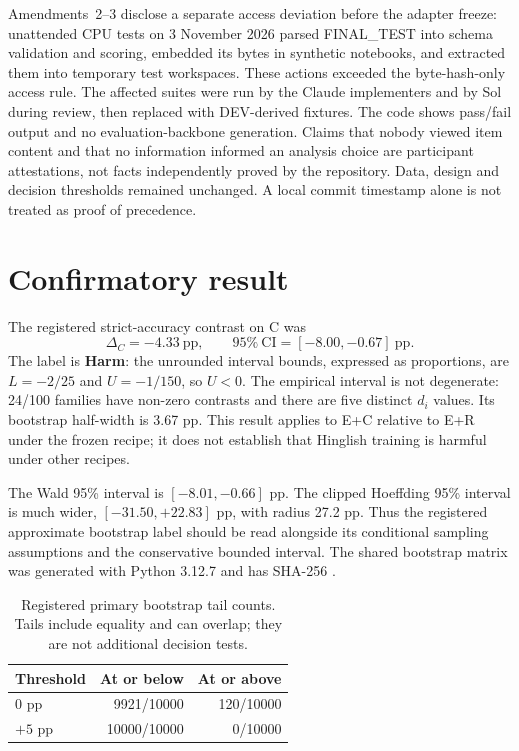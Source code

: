 Amendments~2--3 disclose a separate access deviation before the adapter freeze: unattended CPU tests on 3 November 2026 parsed FINAL\_TEST into schema validation and scoring, embedded its bytes in synthetic notebooks, and extracted them into temporary test workspaces. These actions exceeded the byte-hash-only access rule. The affected suites were run by the Claude implementers and by Sol during review, then replaced with DEV-derived fixtures. The code shows pass/fail output and no evaluation-backbone generation. Claims that nobody viewed item content and that no information informed an analysis choice are participant attestations, not facts independently proved by the repository. Data, design and decision thresholds remained unchanged. A local commit timestamp alone is not treated as proof of precedence.

\section{Confirmatory result}
\label{sec:phase2-confirmatory}
The registered strict-accuracy contrast on C was
\[
 \Delta_C=-4.33\ \mathrm{pp},\qquad
 95\%\ \mathrm{CI}=[-8.00,-0.67]\ \mathrm{pp}.
\]
The label is \textbf{Harm}: the unrounded interval bounds, expressed as proportions, are $L=-2/25$ and $U=-1/150$, so $U<0$. The empirical interval is not degenerate: 24/100 families have non-zero contrasts and there are five distinct $d_i$ values. Its bootstrap half-width is 3.67 pp. This result applies to E+C relative to E+R under the frozen recipe; it does not establish that Hinglish training is harmful under other recipes.

The Wald 95\% interval is $[-8.01,-0.66]$ pp. The clipped Hoeffding 95\% interval is much wider, $[-31.50,+22.83]$ pp, with radius 27.2 pp. Thus the registered approximate bootstrap label should be read alongside its conditional sampling assumptions and the conservative bounded interval. The shared bootstrap matrix was generated with Python 3.12.7 and has SHA-256 .

\begin{table}[H]
\centering\small\singlespacing
\caption{Registered primary bootstrap tail counts. Tails include equality and can overlap; they are not additional decision tests.}
\label{tab:phase2-tails}
\begin{tabular}{@{}lrr@{}}
\toprule
Threshold & At or below & At or above\\
\midrule
$0$ pp & 9921/10000 & 120/10000\\
$+5$ pp & 10000/10000 & 0/10000\\
\bottomrule
\end{tabular}
\end{table}

